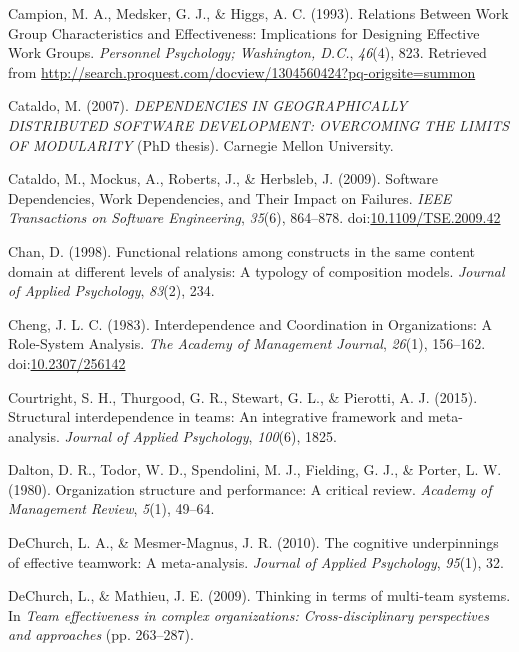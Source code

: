 \documentclass[english,,man]{apa6}
\theoremstyle{definition}
\theoremstyle{definition}
\theoremstyle{definition}
\theoremstyle{remark}
\begin{document}
\leavevmode\hypertarget{ref-campion_relations_1993}{}%
Campion, M. A., Medsker, G. J., \& Higgs, A. C. (1993). Relations
Between Work Group Characteristics and Effectiveness: Implications for
Designing Effective Work Groups. \emph{Personnel Psychology; Washington,
D.C.}, \emph{46}(4), 823. Retrieved from
\url{http://search.proquest.com/docview/1304560424?pq-origsite=summon}

\leavevmode\hypertarget{ref-cataldo_dependencies_nodate}{}%
Cataldo, M. (2007). \emph{DEPENDENCIES IN GEOGRAPHICALLY DISTRIBUTED
SOFTWARE DEVELOPMENT: OVERCOMING THE LIMITS OF MODULARITY} (PhD thesis).
Carnegie Mellon University.

\leavevmode\hypertarget{ref-cataldo_software_2009}{}%
Cataldo, M., Mockus, A., Roberts, J., \& Herbsleb, J. (2009). Software
Dependencies, Work Dependencies, and Their Impact on Failures.
\emph{IEEE Transactions on Software Engineering}, \emph{35}(6),
864--878.
doi:\href{https://doi.org/10.1109/TSE.2009.42}{10.1109/TSE.2009.42}

\leavevmode\hypertarget{ref-chan_functional_1998}{}%
Chan, D. (1998). Functional relations among constructs in the same
content domain at different levels of analysis: A typology of
composition models. \emph{Journal of Applied Psychology}, \emph{83}(2),
234.

\leavevmode\hypertarget{ref-cheng_interdependence_1983}{}%
Cheng, J. L. C. (1983). Interdependence and Coordination in
Organizations: A Role-System Analysis. \emph{The Academy of Management
Journal}, \emph{26}(1), 156--162.
doi:\href{https://doi.org/10.2307/256142}{10.2307/256142}

\leavevmode\hypertarget{ref-courtright_structural_2015}{}%
Courtright, S. H., Thurgood, G. R., Stewart, G. L., \& Pierotti, A. J.
(2015). Structural interdependence in teams: An integrative framework
and meta-analysis. \emph{Journal of Applied Psychology}, \emph{100}(6),
1825.

\leavevmode\hypertarget{ref-dalton_organization_1980}{}%
Dalton, D. R., Todor, W. D., Spendolini, M. J., Fielding, G. J., \&
Porter, L. W. (1980). Organization structure and performance: A critical
review. \emph{Academy of Management Review}, \emph{5}(1), 49--64.

\leavevmode\hypertarget{ref-dechurch2010cognitive}{}%
DeChurch, L. A., \& Mesmer-Magnus, J. R. (2010). The cognitive
underpinnings of effective teamwork: A meta-analysis. \emph{Journal of
Applied Psychology}, \emph{95}(1), 32.

\leavevmode\hypertarget{ref-dechurchmts}{}%
DeChurch, L., \& Mathieu, J. E. (2009). Thinking in terms of multi-team
systems. In \emph{Team effectiveness in complex organizations:
Cross-disciplinary perspectives and approaches} (pp. 263--287).
\end{document}
